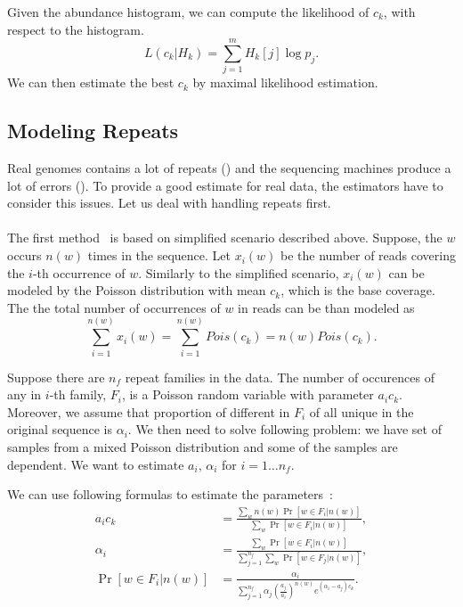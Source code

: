 Given the abundance histogram, we can compute the likelihood of $c_k$, with respect to the histogram.
$$L(c_k | H_k) = \sum_{j=1}^m H_k[j] \log p_j.$$
We can then estimate the best $c_k$ by maximal likelihood estimation.


\subsection{Modeling Repeats}\label{subsec:repeatmodles}


Real genomes contains a lot of repeats () and the sequencing machines produce a lot of errors (). To provide a good estimate for real data, the estimators have to consider this issues. Let us deal with handling repeats first.

\paragraph{}The first method~\cite{waterman} is based on simplified scenario described above. Suppose, the \kmer $w$ occurs $n(w)$ times in the sequence. Let $x_i(w)$ be the number of reads covering the $i$-th occurrence of $w$. Similarly to the simplified scenario, $x_i(w)$ can be modeled by the Poisson distribution with mean $c_k$, which is the base coverage. The the total number of occurrences of $w$ in reads can be than modeled as $$\sum_{i=1}^{n(w)} x_i(w) = \sum_{i=1}^{n(w)} Pois(c_k) = n(w) Pois(c_k).$$

Suppose there are $n_f$ repeat families in the data. The number of occurences of any \kmer in $i$-th family, $F_i$, is a Poisson random variable with parameter $a_i c_k$. Moreover, we assume that proportion of different \kmers in $F_i$ of all unique \kmers in the original sequence is $\alpha_i$.
We then need to solve following problem: we have set of samples from a mixed Poisson distribution and some of the samples are dependent. We want to estimate $a_i,\,\alpha_i$ for $i = 1\dots n_f$.

We can use following formulas to estimate the parameters~\cite{waterman}:
\begin{align*}
a_i c_k & = \frac{\displaystyle\sum_w n(w) \Pr[w \in F_i | n(w)]}{\displaystyle\sum_w \Pr[w \in F_i | n(w)]},\\[1.5ex]
\alpha_i & = \frac{\displaystyle\sum_w \Pr[w \in F_i | n(w)]}{\displaystyle\sum_{j=1}^{n_f}\sum_w \Pr[w \in F_j | n(w)]},\\[1.5ex]
\Pr[w \in F_i | n(w)] & = \frac{\alpha_i}{\displaystyle\sum_{j=1}^{n_f} \alpha_j \left(\frac{a_j}{a_i}\right)^{n(w)} e^{(\alpha_i-a_j)c_k}}.
\end{align*}

